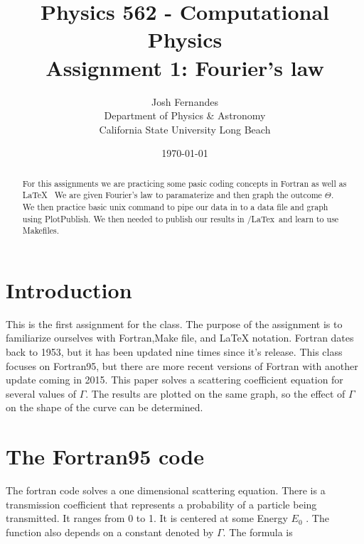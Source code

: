 \documentclass[12pt]{article}
\begin{document}




\title{Physics 562 - Computational Physics\\[.5cm]
Assignment 1: Fourier's law}
\author{Josh Fernandes\\
Department of Physics \& Astronomy\\
California State University Long Beach}
\date{\today}

  
\maketitle



\begin{abstract}
For this assignments we are practicing some pasic coding concepts in Fortran as well as \LaTeX~  We are given Fourier's law to paramaterize and then graph the outcome $\Theta$. We then practice basic unix command to pipe our data in to a data file and graph using PlotPublish. We then needed to publish our results in /LaTex~and learn to use Makefiles. 
\end{abstract}

\section{Introduction}\label{s:intro}

This is the first assignment for the class. The purpose of the assignment is to familiarize ourselves with Fortran,Make file, and LaTeX notation. Fortran dates back to 1953, but it has been updated nine times since it's release. This class focuses on Fortran95, but there are more recent versions of Fortran with another update coming in 2015. This paper solves a scattering coefficient equation for several values of $\Gamma$. The results are plotted on the same graph, so the effect of $\Gamma$ on the shape of the curve can be determined. 



\section{The Fortran95 code}

The fortran code solves a one dimensional scattering equation. There is a transmission coefficient that represents a probability of a particle being transmitted. It ranges from 0 to 1. It is centered at some Energy ${E}_{0}$ . The function also depends on a constant denoted by $\Gamma$. The formula is 
\end{document}
